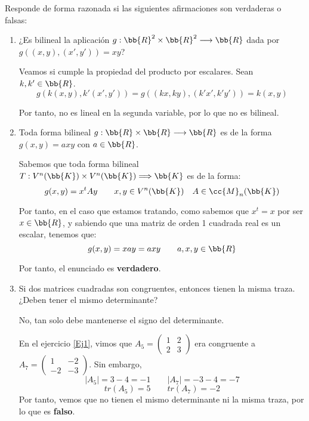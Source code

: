 \begin{ejercicio}
    Responde de forma razonada si las siguientes afirmaciones son verdaderas o falsas:
    \begin{enumerate}
    \renewcommand{\theenumi}{\alph{enumi}}

        \item ¿Es bilineal la aplicación $g : \bb{R}^2 \times \bb{R}^2 \longrightarrow \bb{R}$ dada por $g((x,y), (x',y')) = xy$?

        Veamos si cumple la propiedad del producto por escalares. Sean $k,k'\in \bb{R}$.
        \begin{equation*}
           g(k(x,y), k'(x',y')) = g((kx,ky), (k'x',k'y')) = k(x,y) 
        \end{equation*}

        Por tanto, no es lineal en la segunda variable, por lo que no es bilineal.

        \item Toda forma bilineal $g : \bb{R} \times \bb{R} \longrightarrow \bb{R}$ es de la forma $g(x,y) = axy$ con $a\in \bb{R}$.

        Sabemos que toda forma bilineal $T:V^n(\bb{K}) \times V^n(\bb{K}) \Longrightarrow \bb{K}$ es de la forma:
        \begin{equation*}
            g(x,y)=x^tAy \qquad x,y\in V^n(\bb{K})\quad A\in \cc{M}_n(\bb{K})
        \end{equation*}

        Por tanto, en el caso que estamos tratando, como sabemos que $x^t=x$ por ser $x\in \bb{R}$, y sabiendo que una matriz de orden 1 cuadrada real es un escalar, tenemos que:
        \begin{equation*}
            g(x,y)=xay = axy \qquad a,x,y\in \bb{R}
        \end{equation*}

        Por tanto, el enunciado es \textbf{verdadero}.
        
        \item Si dos matrices cuadradas son congruentes, entonces tienen la misma traza. ¿Deben tener el mismo determinante?

        No, tan solo debe mantenerse el signo del determinante.

        En el ejercicio \ref{Ej1}, vimos que $A_5=\left(\begin{array}{cc}
            1 & 2 \\
            2 & 3
        \end{array}\right)$ era congruente a $A_7=\left(\begin{array}{cc}
            1 & -2 \\
            -2 & -3
        \end{array}\right)$. Sin embargo,
        \begin{equation*}
            |A_5| = 3-4=-1\qquad |A_7|=-3-4=-7
        \end{equation*}
        \begin{equation*}
            tr(A_5)=5 \qquad tr(A_7)=-2
        \end{equation*}
        Por tanto, vemos que no tienen el mismo determinante ni la misma traza, por lo que es \textbf{falso}.


\end{enumerate}
\end{ejercicio}
